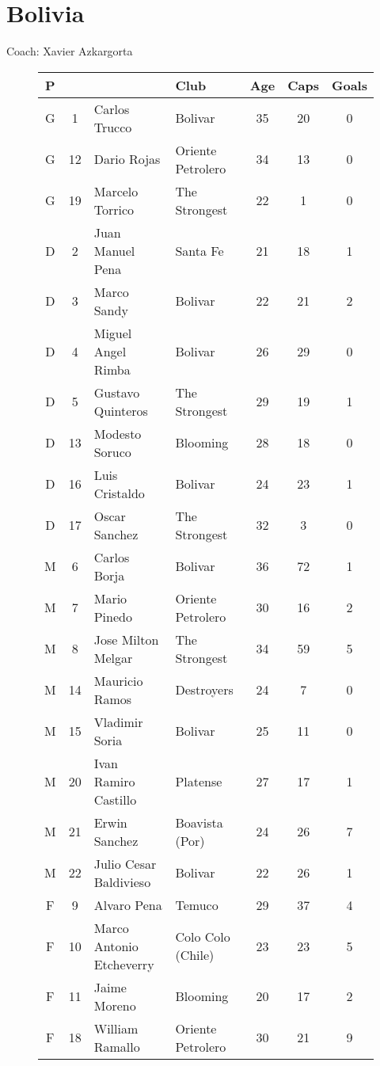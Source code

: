 \chapter{Bolivia}
\newline
\newline
Coach: Xavier Azkargorta
\begin{figure}[H]
\begin{tabular}{c c l l c c c}
P & & & Club & Age & Caps & Goals \\ \hline
G & 1 & Carlos Trucco & Bolivar &  35 & 20 & 0 \\
G & 12 & Dario Rojas & Oriente Petrolero & 34 & 13 & 0 \\
G & 19 & Marcelo Torrico & The Strongest & 22 & 1 & 0 \\ \hline
D & 2 & Juan Manuel Pena & Santa Fe & 21 & 18 & 1 \\
D & 3 & Marco Sandy & Bolivar & 22 & 21 & 2 \\
D & 4 & Miguel Angel Rimba & Bolivar & 26 & 29 & 0 \\
D & 5 & Gustavo Quinteros & The Strongest & 29 & 19 & 1 \\
D & 13 & Modesto Soruco & Blooming & 28 & 18 & 0 \\
D & 16 & Luis Cristaldo & Bolivar & 24 & 23 & 1 \\
D & 17 & Oscar Sanchez & The Strongest & 32 & 3 & 0 \\ \hline
M & 6 & Carlos Borja & Bolivar & 36 & 72 & 1 \\
M & 7 & Mario Pinedo & Oriente Petrolero & 30 & 16 & 2 \\
M & 8 & Jose Milton Melgar & The Strongest & 34 & 59 & 5 \\
M & 14 & Mauricio Ramos & Destroyers & 24 & 7 & 0 \\
M & 15 & Vladimir Soria & Bolivar & 25 & 11 & 0 \\
M & 20 & Ivan Ramiro Castillo & Platense & 27 & 17 & 1 \\
M & 21 & Erwin Sanchez & Boavista (Por) & 24 & 26 & 7 \\
M & 22 & Julio Cesar Baldivieso & Bolivar & 22 & 26 & 1 \\ \hline
F & 9 & Alvaro Pena & Temuco & 29 & 37 & 4 \\
F & 10 & Marco Antonio Etcheverry & Colo Colo (Chile) & 23 & 23 & 5 \\
F & 11 & Jaime Moreno & Blooming & 20 & 17 & 2 \\
F & 18 & William Ramallo & Oriente Petrolero & 30 & 21 & 9 \\ \hline
\end{tabular}
\end{figure}
